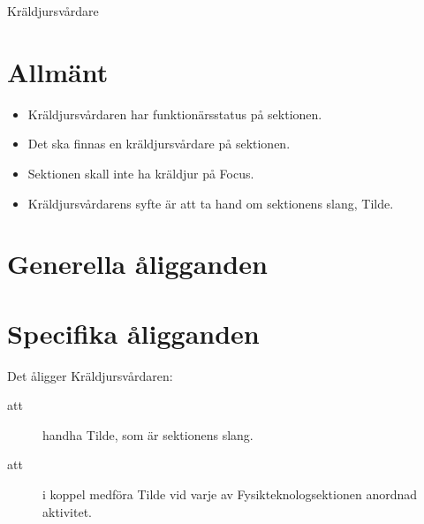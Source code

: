 \documentclass[a4paper]{article}
\begin{document}
\renewcommand{\forening}{Kräldjursvårdare} %

\begin{foreningenv}{\forening{}} %
    \section{Allmänt}
    \begin{itemize}
        \item Kräldjursvårdaren har funktionärsstatus på sektionen.
        \item Det ska finnas en kräldjursvårdare på sektionen.
        \item Sektionen skall inte ha kräldjur på Focus.
        \item Kräldjursvårdarens syfte är att ta hand om sektionens slang, Tilde.
    \end{itemize}
    
    \section{Generella åligganden}
    \aliggsektfunkt{}
    
    \section{Specifika åligganden}
    Det åligger \forening{}n:
    \begin{description}
        \item[att] handha Tilde, som är sektionens slang.
        \item[att] i koppel medföra Tilde vid varje av Fysikteknologsektionen anordnad aktivitet.
    \end{description}
\end{foreningenv}
\end{document}
